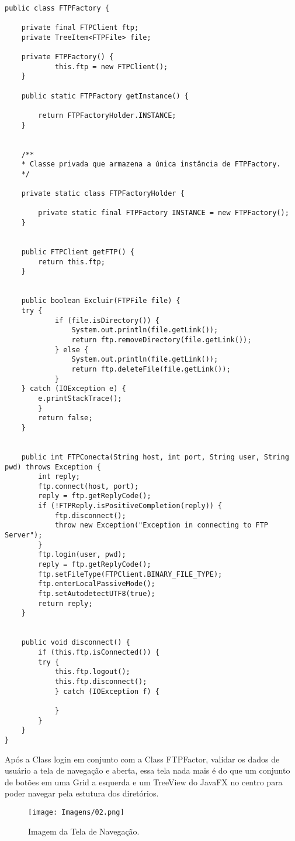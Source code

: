 \documentclass[12pt]{article}
\begin{document}
\begin{lstlisting}

public class FTPFactory {
	
	private final FTPClient ftp;
	private TreeItem<FTPFile> file;
		
	private FTPFactory() {
			this.ftp = new FTPClient();
	}
	
	public static FTPFactory getInstance() {
	
		return FTPFactoryHolder.INSTANCE;
	}


	/**
	* Classe privada que armazena a única instância de FTPFactory.
	*/
	
	private static class FTPFactoryHolder {
	
		private static final FTPFactory INSTANCE = new FTPFactory();
	}


	public FTPClient getFTP() {
		return this.ftp;
	}


	public boolean Excluir(FTPFile file) {
	try {
			if (file.isDirectory()) {
				System.out.println(file.getLink());
				return ftp.removeDirectory(file.getLink());
			} else {
				System.out.println(file.getLink());
				return ftp.deleteFile(file.getLink());
			}
	} catch (IOException e) {
		e.printStackTrace();
		}	
		return false;
	}


	public int FTPConecta(String host, int port, String user, String pwd) throws Exception {
		int reply;
		ftp.connect(host, port);
		reply = ftp.getReplyCode();
		if (!FTPReply.isPositiveCompletion(reply)) {
			ftp.disconnect();
			throw new Exception("Exception in connecting to FTP Server");
		}
		ftp.login(user, pwd);
		reply = ftp.getReplyCode();
		ftp.setFileType(FTPClient.BINARY_FILE_TYPE);
		ftp.enterLocalPassiveMode();
		ftp.setAutodetectUTF8(true);
		return reply;
	}


	public void disconnect() {
		if (this.ftp.isConnected()) {
		try {
			this.ftp.logout();
			this.ftp.disconnect();
			} catch (IOException f) {
	
			}
	    }
	}
}	

\end{lstlisting}

Após a Class login em conjunto com a Class FTPFactor, validar os dados de usuário a tela de navegação e aberta, essa tela nada mais é do que um conjunto de botões em uma Grid a esquerda e um TreeView do JavaFX no centro para poder navegar pela estutura dos diretórios.

\begin{figure}[H]
	\centering
	\texttt{[image: Imagens/02.png]}
	\caption{ Imagem da Tela de Navegação.}
	\label{fig:03}
\end{figure}
\end{document}

